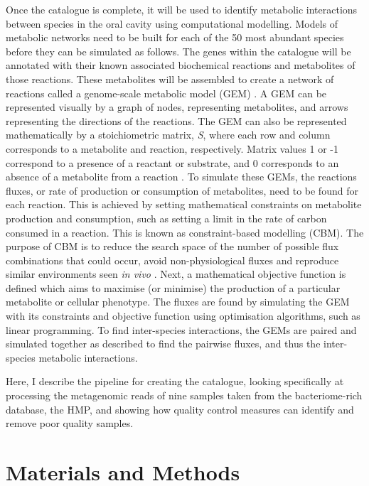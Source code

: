 \documentclass[a4paper]{article}
\begin{document}
Once the catalogue is complete, it will be used to identify metabolic interactions between species in the oral cavity using computational modelling. Models of metabolic networks need to be built for each of the 50 most abundant species before they can be simulated as follows. The genes within the catalogue will be annotated with their known associated biochemical reactions and metabolites of those reactions. These metabolites will be assembled to create a network of reactions called a genome-scale metabolic model (GEM) \cite{agren_raven_2013, baart_genome-scale_2012}. A GEM can be represented visually by a graph of nodes, representing metabolites, and arrows representing the directions of the reactions. The GEM can also be represented mathematically by a stoichiometric matrix, \textit{S}, where each row and column corresponds to a metabolite and reaction, respectively. Matrix values 1 or -1 correspond to a presence of a reactant or substrate, and 0 corresponds to an absence of a metabolite from a reaction \cite{obrien_using_2015}. To simulate these GEMs, the reactions fluxes, or rate of production or consumption of metabolites, need to be found for each reaction. This is achieved by setting mathematical constraints on metabolite production and consumption, such as setting a limit in the rate of carbon consumed in a reaction. This is known as constraint-based modelling (CBM). The purpose of CBM is to reduce the search space of the number of possible flux combinations that could occur, avoid non-physiological fluxes and reproduce similar environments seen \textit{in vivo} \cite{magnusdottir_generation_2017, bordbar_constraint-based_2014}. Next, a mathematical objective function is defined which aims to maximise (or minimise) the production of a particular metabolite or cellular phenotype. The fluxes are found by simulating the GEM with its constraints and objective function using optimisation algorithms, such as linear programming. To find inter-species interactions, the GEMs are paired and simulated together as described to find the pairwise fluxes, and thus the inter-species metabolic interactions.

Here, I describe the pipeline for creating the catalogue, looking specifically at processing the metagenomic reads of nine samples taken from the bacteriome-rich database, the HMP, and showing how quality control measures can identify and remove poor quality samples.

\section{Materials and Methods}
\end{document}
